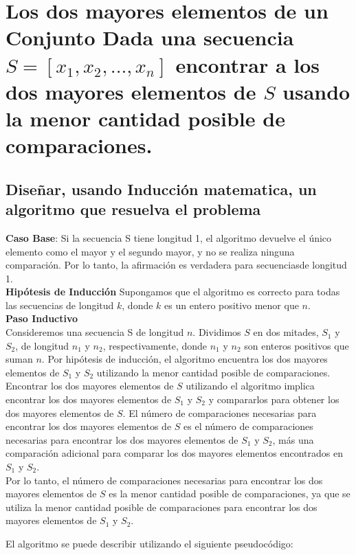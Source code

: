 \section{Los dos mayores elementos de un Conjunto
Dada una secuencia $S= [x_1, x_2, . . . , x_n]$ encontrar a los dos mayores elementos de $S$ usando la menor cantidad posible de comparaciones.}

\subsection{Diseñar, usando Inducción matematica, un algoritmo que resuelva el problema}

\textbf{Caso Base}:  Si la secuencia S tiene longitud 1, el algoritmo devuelve el único elemento como 
el mayor 
y el segundo mayor, y no se realiza ninguna comparación. Por lo tanto, la afirmación es verdadera para 
secuenciasde longitud 1.\\
\textbf{Hipótesis de Inducción} Supongamos que el algoritmo es correcto para todas las secuencias de 
longitud $k$, donde $k$ es un entero positivo menor que $n$.\\
\textbf{Paso Inductivo}\\
Consideremos una secuencia S de longitud $n$. Dividimos $S$ en dos mitades, $S_1$ y $S_2$, 
de longitud $n_1$ y $n_2$, respectivamente, donde $n_1$ y $n_2$ son enteros positivos que suman $n$. 
Por hipótesis de inducción, el algoritmo encuentra los dos mayores elementos de $S_1$ y $S_2$ utilizando 
la menor cantidad posible de comparaciones.\\

Encontrar los dos mayores elementos de $S$ utilizando el algoritmo implica encontrar los 
dos mayores elementos de $S_1$ y $S_2$ y compararlos para obtener los dos mayores elementos de $S$. 
El número de comparaciones necesarias para encontrar los dos mayores elementos de $S$ es el número de 
comparaciones necesarias para encontrar los dos mayores elementos de $S_1$ y $S_2$, más una comparación 
adicional para comparar los dos mayores elementos encontrados en $S_1$ y $S_2$.\\

Por lo tanto, el número de comparaciones necesarias para encontrar los dos mayores elementos de $S$ 
es la menor cantidad posible de comparaciones, ya que se utiliza la menor cantidad posible de comparaciones 
para encontrar los dos mayores elementos de $S_1$ y $S_2$.

El algoritmo se puede describir utilizando el siguiente pseudocódigo:

